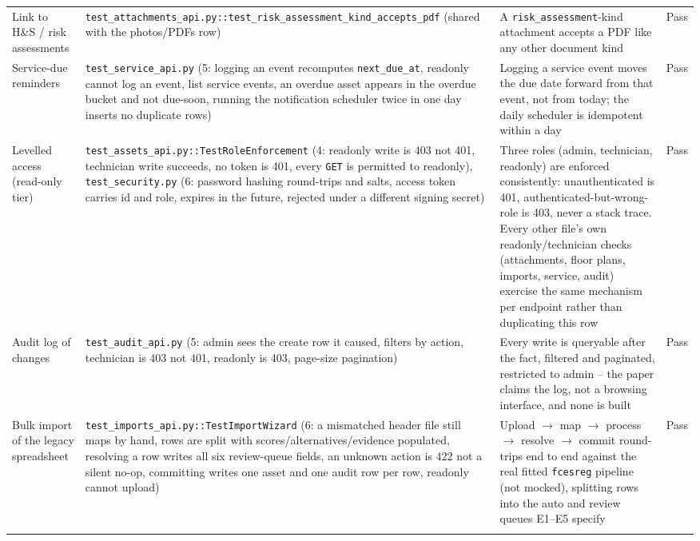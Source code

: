 \documentclass[11pt]{article}
\begin{document}
\begin{longtable}{p{3.1cm}p{5.0cm}p{4.3cm}p{1.0cm}}
Link to H\&S / risk assessments &
\texttt{test\_\allowbreak{}attachments\_\allowbreak{}api.py\allowbreak{}::\allowbreak{}test\_\allowbreak{}risk\_\allowbreak{}assessment\_\allowbreak{}kind\_\allowbreak{}accepts\_\allowbreak{}pdf} (shared with the
photos/PDFs row) &
A \texttt{risk\_\allowbreak{}assessment}-kind attachment accepts a PDF like any other document kind & Pass \\
\addlinespace

Service-due reminders &
\texttt{test\_\allowbreak{}service\_\allowbreak{}api.py\allowbreak{}} (5: logging an event recomputes \texttt{next\_\allowbreak{}due\_\allowbreak{}at}, readonly
cannot log an event, list service events, an overdue asset appears in the overdue bucket and not
due-soon, running the notification scheduler twice in one day inserts no duplicate rows) &
Logging a service event moves the due date forward from that event, not from today; the daily
scheduler is idempotent within a day & Pass \\
\addlinespace

Levelled access (read-only tier) &
\texttt{test\_\allowbreak{}assets\_\allowbreak{}api.py\allowbreak{}::\allowbreak{}TestRoleEnforcement} (4: readonly write is 403 not 401, technician
write succeeds, no token is 401, every \texttt{GET} is permitted to readonly),
\texttt{test\_\allowbreak{}security.py\allowbreak{}} (6: password hashing round-trips and salts, access token carries id
and role, expires in the future, rejected under a different signing secret) &
Three roles (admin, technician, readonly) are enforced consistently: unauthenticated is 401,
authenticated-but-wrong-role is 403, never a stack trace. Every other file's own
readonly/technician checks (attachments, floor plans, imports, service, audit) exercise the same
mechanism per endpoint rather than duplicating this row & Pass \\
\addlinespace

Audit log of changes &
\texttt{test\_\allowbreak{}audit\_\allowbreak{}api.py\allowbreak{}} (5: admin sees the create row it caused, filters by action,
technician is 403 not 401, readonly is 403, page-size pagination) &
Every write is queryable after the fact, filtered and paginated, restricted to admin -- the
paper claims the log, not a browsing interface, and none is built & Pass \\
\addlinespace

Bulk import of the legacy spreadsheet &
\texttt{test\_\allowbreak{}imports\_\allowbreak{}api.py\allowbreak{}::\allowbreak{}TestImportWizard} (6: a mismatched header file still maps by
hand, rows are split with scores/alternatives/evidence populated, resolving a row writes all
six review-queue fields, an unknown action is 422 not a silent no-op, committing writes one
asset and one audit row per row, readonly cannot upload) &
Upload $\to$ map $\to$ process $\to$ resolve $\to$ commit round-trips end to end against the
real fitted \texttt{fcesreg} pipeline (not mocked), splitting rows into the auto and review
queues E1--E5 specify & Pass \\
\addlinespace


\end{longtable}
\end{document}
